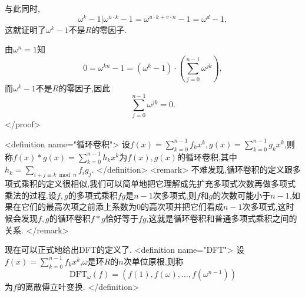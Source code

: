 与此同时,$$\omega^k-1|\omega^{u\cdot k}-1=\omega^{u\cdot k+v\cdot n}-1=\omega^d-1,$$这就证明了$\omega^k-1$不是$R$的零因子.

由$\omega^n=1$知$$0=\omega^{kn}-1=(\omega^k-1)\cdot(\sum_{j=0}^{n-1}\omega^{jk}),$$而$\omega^k-1$不是$R$的零因子,因此$$\sum_{j=0}^{n-1}\omega^{jk}=0.$$
</proof>

<definition  name="循环卷积">
设$f(x)=\sum\limits_{k=0}^{n-1}f_kx^k,g(x)=\sum\limits_{k=0}^{n-1}g_kx^k$,则称$f(x)*g(x)=\sum\limits_{k=0}^{n-1}h_kx^k$为$f(x),g(x)$的循环卷积,其中$h_k=\sum\limits_{i+j\equiv k\bmod n}f_ig_j$.
</definition>
<remark>
不难发现,循环卷积的定义跟多项式乘积的定义很相似,我们可以简单地把它理解成先扩充多项式次数再做多项式乘法的过程.设$f,g$的多项式乘积$fg$是$n-1$次多项式,则$f$和$g$的次数可能小于$n-1$,如果在它们的最高次项之前添上系数为0的高次项并把它们看成$n-1$次多项式,这时候会发现$f,g$的循环卷积$f*g$恰好等于$fg$,这就是循环卷积和普通多项式乘积之间的关系.
</remark>

现在可以正式地给出DFT的定义了.
<definition  name="DFT">
设$f(x)=\sum\limits_{k=0}^{n-1}f_kx^k$,$\omega$是环$R$的$n$次单位原根,则称$$\mathrm{DFT}_{\omega}(f)=(f(1),f(\omega),\ldots,f(\omega^{n-1}))$$为$f$的离散傅立叶变换.
</definition>

